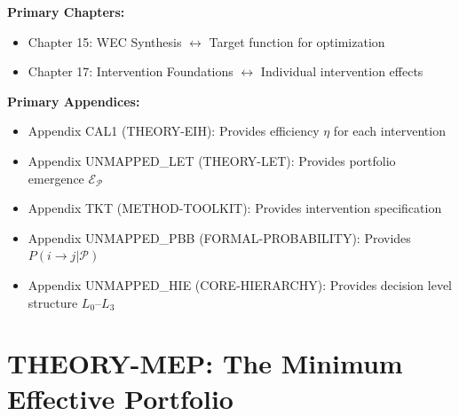 \begin{tcolorbox}[colback=purple!5!white, colframe=purple!75!black,
    title=Chapter Linkage]

\textbf{Primary Chapters:}
\begin{itemize}[nosep]
\item Chapter 15: WEC Synthesis $\leftrightarrow$ Target function for optimization
\item Chapter 17: Intervention Foundations $\leftrightarrow$ Individual intervention effects
\end{itemize}

\textbf{Primary Appendices:}
\begin{itemize}[nosep]
\item Appendix CAL1 (THEORY-EIH): Provides efficiency $\eta$ for each intervention
\item Appendix UNMAPPED_LET (THEORY-LET): Provides portfolio emergence $\mathcal{E}_{\mathcal{P}}$
\item Appendix TKT (METHOD-TOOLKIT): Provides intervention specification
\item Appendix UNMAPPED_PBB (FORMAL-PROBABILITY): Provides $P(i \to j | \mathcal{P})$
\item Appendix UNMAPPED_HIE (CORE-HIERARCHY): Provides decision level structure $L_0$--$L_3$
\end{itemize}

\end{tcolorbox}


\chapter{THEORY-MEP: The Minimum Effective Portfolio}
\label{app:theory-mep}


\begin{abstract}
How many interventions at which decision levels are needed to change behavior?
This appendix answers this question by formalizing the \textbf{Minimum Effective
Portfolio (MEP)} problem---the behavioral analogue to Markowitz's Minimum Variance
Portfolio in finance. We prove that optimal intervention portfolios minimize cost
subject to a minimum effectiveness constraint, where effectiveness depends on
individual intervention effects, their efficiency (EIH), and portfolio emergence
(LET). The key insight: while financial portfolios benefit from low covariance
(diversification), behavioral portfolios benefit from high complementarity
(synergy). We derive the Behavioral Efficient Frontier and provide analytical
solutions for special cases.
\end{abstract}

